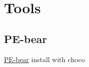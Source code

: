 \section{Tools}

\subsection{PE-bear}

\href{https://github.com/hasherezade/pe-bear}{PE-bear} install with choco
